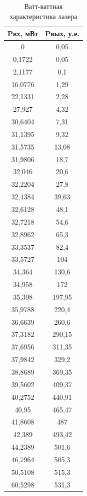 \documentclass[a4paper,12pt]{article}
\begin{document}
\begin{table}[]
	\caption{Ватт-ваттная характеристика лазера}
	\begin{tabular}{|c|c|}
	\hline
	Pвх, мВт & Pвых, у.е. \\ \hline
	0        & 0,05       \\ \hline
	0,1722   & 0,05       \\ \hline
	2,1177   & 0,1        \\ \hline
	16,0776  & 1,29       \\ \hline
	22,1331  & 2,28       \\ \hline
	27,927   & 4,32       \\ \hline
	30,6404  & 7,31       \\ \hline
	31,1395  & 9,32       \\ \hline
	31,5735  & 13,08      \\ \hline
	31,9806  & 18,7       \\ \hline
	32,046   & 20,6       \\ \hline
	32,2204  & 27,8       \\ \hline
	32,4384  & 39,63      \\ \hline
	32,6128  & 48,1       \\ \hline
	32,7218  & 54,6       \\ \hline
	32,8962  & 65,3       \\ \hline
	33,3537  & 82,4       \\ \hline
	33,5727  & 104        \\ \hline
	34,364   & 130,6      \\ \hline
	34,958   & 172        \\ \hline
	35,398   & 197,95     \\ \hline
	35,9788  & 220,4      \\ \hline
	36,6639  & 260,6      \\ \hline
	37,3182  & 290,15     \\ \hline
	37,6956  & 311,35     \\ \hline
	37,9842  & 329,2      \\ \hline
	38,8689  & 369,35     \\ \hline
	39,5602  & 409,37     \\ \hline
	40,2752  & 440,91     \\ \hline
	40,95    & 465,47     \\ \hline
	41,8608  & 487        \\ \hline
	42,389   & 493,42     \\ \hline
	44,2389  & 501,6      \\ \hline
	46,7964  & 505,3      \\ \hline
	50,5108  & 515,3      \\ \hline
	60,5298  & 531,3      \\ \hline
	\end{tabular}
	\end{table}
\end{document}
